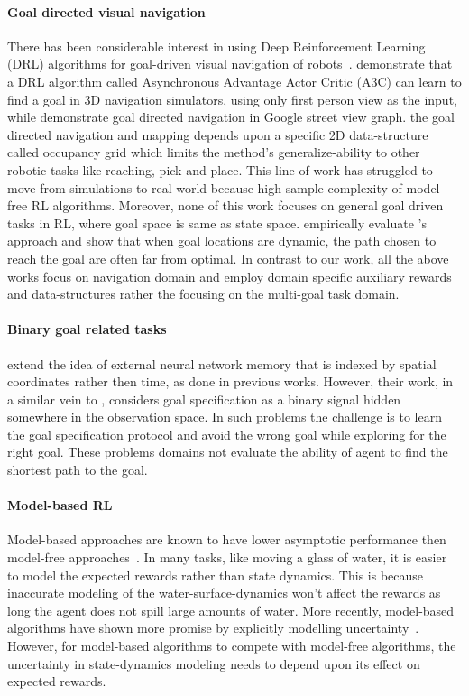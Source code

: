 \paragraph{Goal directed visual navigation}
There has been considerable interest in using Deep Reinforcement Learning (DRL)
algorithms for goal-driven visual navigation of
robots~\citep{mirowski2016learning,MiPaViICLR2017,dhiman2018critical,gupta2017cognitive,savinov2018semi}.
\cite{mirowski2016learning} demonstrate that a DRL algorithm called Asynchronous
Advantage Actor Critic (A3C) can learn to find a goal in 3D navigation
simulators, using only first person view as the input, while
\cite{MiPaViICLR2017} demonstrate goal directed navigation in Google street view
graph. \citet{gupta2017cognitive} the goal directed navigation and mapping
depends upon a specific 2D data-structure called occupancy grid which limits the
method's generalize-ability to other robotic tasks like reaching, pick and
place. This line of work has struggled to move from simulations to real world
because high sample complexity of model-free RL algorithms. Moreover, none of
this work focuses on general goal driven tasks in RL, where goal space is same
as state space. \citet{dhiman2018critical} empirically evaluate
\cite{mirowski2016learning}'s approach and show that when goal locations are
dynamic, the path chosen to reach the goal are often far from optimal.
In contrast to our work, all the above works focus on navigation domain and
employ domain specific auxiliary rewards and data-structures rather the focusing
on the multi-goal task domain.

\paragraph{Binary goal related tasks}
\citet{parisotto2017neural} extend the idea of external neural network memory
that is indexed by spatial coordinates rather then time, as done in previous
works. However, their work, in a similar vein to \cite{OhChSiICML2016},
considers goal specification as a binary signal hidden somewhere in the
observation space. In such problems the challenge is to learn the goal
specification protocol and avoid the wrong goal while exploring for the right
goal. These problems domains not evaluate the ability of agent to find the
shortest path to the goal.

\paragraph{Model-based RL}
Model-based approaches are known to have lower asymptotic performance then
model-free approaches~\cite{pong2018temporal}. In many tasks, like moving a
glass of water, it is easier to model the expected rewards rather than state
dynamics. This is because inaccurate modeling of the water-surface-dynamics
won't affect the rewards as long the agent does not spill large amounts of
water. More recently, model-based algorithms have shown more promise by
explicitly modelling uncertainty~\cite{lakshminarayanan2017simple,
  kurutach2018model,zhang2018solar}.
However, for model-based algorithms to compete with model-free algorithms, the
uncertainty in state-dynamics modeling needs to depend upon its effect on
expected rewards.


